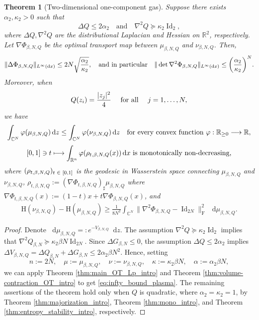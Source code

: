 \documentclass[10pt]{amsart}
\newtheorem{theo}{Theorem}[section]
\theoremstyle{definition}\newtheorem{defi}[theo]{Definition}\newtheorem{rema}[theo]{Remark}\newtheorem{exam}[theo]{Example}\newtheorem{exem}[theo]{Example}\newtheorem{nota}[theo]{Notation}
\newcommand{\R}{\mathbb R}
\newcommand{\C}{\mathbb C}
\DeclareMathOperator{\Id}{Id}
\newcommand{\Ent}{\mathrm H}
\newcommand{\V}{V}
\newcommand{\dd}{n}
\newcommand{\prob}{\rho}
\newcommand{\source}{\mu}
\newcommand{\target}{\nu}
\newcommand{\lsh}{\alpha}
\newcommand{\lc}{\kappa}
\newcommand*\diff{\mathop{}\!\mathrm{d}}
\newcommand{\OT}{\Phi}
\newcommand{\cxfun}{\varphi}
\renewcommand*{\to}{\mathchoice{\longrightarrow}{\rightarrow}{\rightarrow}{\rightarrow}}
\let\oldmapsto\mapsto
\renewcommand*{\mapsto}{\mathchoice{\longmapsto}{\oldmapsto}{\oldmapsto}{\oldmapsto}}
\let\originalleft\left
\let\originalright\right
\renewcommand{\left}{\mathopen{}\mathclose\bgroup\originalleft}
\renewcommand{\right}{\aftergroup\egroup\originalright}
\let\oldin\in
\renewcommand{\in}{\mathchoice{\oldin}{\oldin}{\,\oldin\,}{\,\oldin\,}}
\begin{document}
\begin{theo}[Two-dimensional one-component gas]\label{thm:Coulomb}
Suppose there exists $\lsh_2,\lc_2>0$ such that 
\[
\Delta Q \le 2\lsh_2\quad\text{and}\quad \nabla^2Q \succeq \lc_2 \Id_{2},
\]
where $\Delta Q, \nabla^2Q$ are the distributional Laplacian and Hessian on $\R^2$, respectively. Let $\nabla\OT_{\beta,N,Q}$ be the optimal transport map between $\source_{\beta,N,Q}$ and $\target_{\beta,N,Q}$. Then, 
\begin{align}
\label{eq:infty_bound_plasma}
\|\Delta\OT_{\beta,N,Q}\|_{L^{\infty}(\diff x)}\le 2N\sqrt{\frac{\lsh_2}{\lc_2}} ,\quad\text{and in particular}\quad  \|\det\nabla^2\OT_{\beta,N,Q}\|_{L^{\infty}(\diff x)}\le \left(\frac{\lsh_2}{\lc_2}\right)^N.
\end{align}
Moreover, when 
\begin{equation}
\label{eq:quad_coulomb}
Q(z_i)=\frac{|z_j|^2}{4}\quad\textnormal{ for all }\quad j=1,\ldots, N,
\end{equation}
we have
\begin{align}
\label{eq:majorization_plasma}
\int_{\C^N} \cxfun(\source_{\beta,N,Q})\diff z\le \int_{\C^N} \cxfun(\target_{\beta,N,Q})\diff z\quad\text{for every convex function }\mathrm \cxfun:\R_{\ge 0} \to \R,
\end{align}
\begin{equation}
\label{eq:mono_geo_plasma}
[0,1]\ni t\mapsto \int_{\R^{\dd}}\cxfun(\prob_{t,\beta,N,Q}(x))\diff x\textnormal{ is monotonically non-decreasing},
\end{equation}
where  $(\prob_{t,\beta,N,Q})_{t\in [0,1]}$ is the geodesic in Wasserstein space connecting $\source_{\beta,N,Q}$ and $\target_{\beta,N,Q}$, $\prob_{t,\beta,N,Q}:=(\nabla\OT_{t,\beta,N,Q})_{\sharp}\source_{\beta,N,Q}$ where $\nabla\OT_{t,\beta,N,Q}(x):=(1-t)x+t\nabla\OT_{\beta,N,Q}(x)$, and
\begin{align}
\label{eq:entropy_stability_plasma}
\Ent(\target_{\beta,N,Q})- \Ent(\source_{\beta,N,Q}) \ge   \frac{1}{8N^2}\int_{\C^N}\|\nabla^2\OT_{\beta,N,Q}-\Id_{2N}\|_{\text{F}}^2\,\diff \source_{\beta,N,Q}.
\end{align}
\end{theo}
\begin{proof}
Denote $\diff\source_{\beta,N,Q}=:e^{-\V_{\beta,N,Q}}\diff z$. The assumption $\nabla^2Q  \succeq \lc_2 \Id_{2}$ implies that $\nabla^2Q_{\beta,N}  \succeq \lc_2 \beta N\Id_{2N}$. Since $\Delta  G_{\beta,N}\le 0$, the assumption $\Delta Q \le 2\lsh_2$ implies $\Delta \V_{\beta,N,Q}=\Delta Q_{\beta,N}+\Delta  G_{\beta,N}\le 2\lsh_2\beta N^2$.  Hence, setting 
\[
\dd:=2N,\quad \source:=\source_{\beta,N,Q},\quad\target:=\target_{\beta,N,Q},\quad \lc:=\lc_2\beta N,\quad \lsh:=\lsh_2\beta N,
\]
we can apply Theorem \ref{thm:main_OT_Lp_intro}  and Theorem \ref{thm:volume-contraction_OT_intro} to get \eqref{eq:infty_bound_plasma}. The remaining assertions of the theorem hold only when $Q$ is quadratic,  where $\lsh_2=\lc_2=1$, by Theorem \ref{thm:majorization_intro}, Theorem \ref{thm:mono_intro}, and Theorem \ref{thm:entropy_stability_intro}, respectively.
\end{proof}
\end{document}
